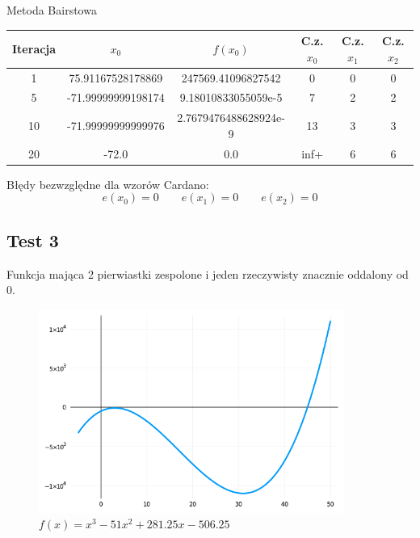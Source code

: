 \documentclass[a4paper]{article}
\begin{document}
    \begin{center}
        Metoda Bairstowa
    \end{center}
    \begin{center}
        \begin{tabular}{|c|c|c|c|c|c|} 
            \hline
            Iteracja & $x_0$ & $f(x_0)$ & C.z. $x_0$ & C.z. $x_1$ & C.z. $x_2$ \\
            \hline
            1 & 75.91167528178869 & 247569.41096827542 & 0 & 0 & 0 \\ 
            \hline
            5 & -71.99999999198174 & 9.18010833055059e-5 & 7 & 2 & 2 \\ 
            \hline
            10 & -71.99999999999976 & 2.7679476488628924e-9 & 13 & 3 & 3 \\
            \hline
            20 & -72.0 & 0.0 & inf+ & 6 & 6 \\
            \hline
        \end{tabular}
    \end{center}

    \vspace{5mm}

    \begin{center}
        Błędy bezwzględne dla wzorów Cardano:
        \[
            e(x_0) = 0 \qquad e(x_1) = 0 \qquad e(x_2) = 0  
        \]
    \end{center}

\newpage
\subsection{Test 3}
    Funkcja mająca 2 pierwiastki zespolone i jeden rzeczywisty znacznie oddalony od 0.
    \begin{figure}[h]
        \centering
        \includegraphics[width=10cm]{3}
        \caption{$f(x) = x^3 - 51x^2 + 281.25x - 506.25$}
    \end{figure}
\end{document}
